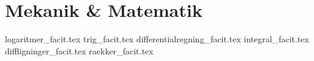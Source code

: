 \documentclass[crop=false, class=memoir]{standalone}
\begin{document}
\chapter{Mekanik \& Matematik} \label{chap:mat_facit}

{logaritmer_facit.tex}
{trig_facit.tex}
{differentialregning_facit.tex}
{integral_facit.tex}
{diffligninger_facit.tex}
{raekker_facit.tex}
\end{document}
